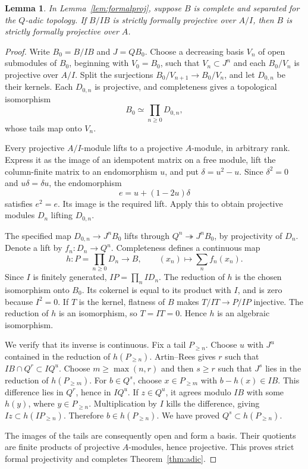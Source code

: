 \documentclass[11pt]{article}
\newtheorem{lemma}[theorem]{Lemma}
\theoremstyle{definition}\newtheorem{definition}[theorem]{Definition}
\theoremstyle{remark}\newtheorem{remark}[theorem]{Remark}
\begin{document}
\begin{lemma}\label{lem:strictproj}
In Lemma~\ref{lem:formalproj}, suppose $B$ is complete and separated for the $Q$-adic topology. If $B/IB$ is strictly formally projective over $A/I$, then $B$ is strictly formally projective over $A$.
\end{lemma}
\begin{proof}
Write $B_0=B/IB$ and $J=QB_0$. Choose a decreasing basis $V_n$ of open submodules of $B_0$, beginning with $V_0=B_0$, such that $V_n\subset J^n$ and each $B_0/V_n$ is projective over $A/I$. Split the surjections $B_0/V_{n+1}\to B_0/V_n$, and let $D_{0,n}$ be their kernels. Each $D_{0,n}$ is projective, and completeness gives a topological isomorphism
\[
 B_0\simeq\prod_{n\geq0}D_{0,n},
\]
whose tails map onto $V_n$.

Every projective $A/I$-module lifts to a projective $A$-module, in arbitrary rank. Express it as the image of an idempotent matrix on a free module, lift the column-finite matrix to an endomorphism $u$, and put $\delta=u^2-u$. Since $\delta^2=0$ and $u\delta=\delta u$, the endomorphism
\[
 e=u+(1-2u)\delta
\]
satisfies $e^2=e$. Its image is the required lift. Apply this to obtain projective modules $D_n$ lifting $D_{0,n}$.

The specified map $D_{0,n}\to J^nB_0$ lifts through $Q^n\twoheadrightarrow J^nB_0$, by projectivity of $D_n$. Denote a lift by $f_n:D_n\to Q^n$. Completeness defines a continuous map
\[
 h:P=\prod_{n\geq0}D_n\longrightarrow B,
 \qquad (x_n)\longmapsto\sum_n f_n(x_n).
\]
Since $I$ is finitely generated, $IP=\prod_n ID_n$. The reduction of $h$ is the chosen isomorphism onto $B_0$. Its cokernel is equal to its product with $I$, and is zero because $I^2=0$. If $T$ is the kernel, flatness of $B$ makes $T/IT\to P/IP$ injective. The reduction of $h$ is an isomorphism, so $T=IT=0$. Hence $h$ is an algebraic isomorphism.

We verify that its inverse is continuous. Fix a tail $P_{\geq n}$. Choose $u$ with $J^u$ contained in the reduction of $h(P_{\geq n})$. Artin--Rees gives $r$ such that $IB\cap Q^r\subset IQ^u$. Choose $m\geq\max(n,r)$ and then $s\geq r$ such that $J^s$ lies in the reduction of $h(P_{\geq m})$. For $b\in Q^s$, choose $x\in P_{\geq m}$ with $b-h(x)\in IB$. This difference lies in $Q^r$, hence in $IQ^u$. If $z\in Q^u$, it agrees modulo $IB$ with some $h(y)$, where $y\in P_{\geq n}$. Multiplication by $I$ kills the difference, giving $Iz\subset h(IP_{\geq n})$. Therefore $b\in h(P_{\geq n})$. We have proved $Q^s\subset h(P_{\geq n})$.

The images of the tails are consequently open and form a basis. Their quotients are finite products of projective $A$-modules, hence projective. This proves strict formal projectivity and completes Theorem~\ref{thm:adic}.
\end{proof}
\end{document}
